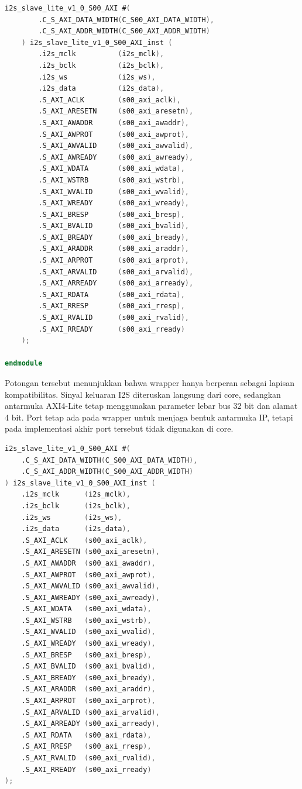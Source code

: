 \begin{lstlisting}[language=Verilog,caption={Wrapper IP \texttt{i2s.v} yang meneruskan antarmuka AXI4-Lite dan keluaran I2S ke core.},label={lst:ch4-wrapper}]
    i2s_slave_lite_v1_0_S00_AXI #(
        .C_S_AXI_DATA_WIDTH(C_S00_AXI_DATA_WIDTH),
        .C_S_AXI_ADDR_WIDTH(C_S00_AXI_ADDR_WIDTH)
    ) i2s_slave_lite_v1_0_S00_AXI_inst (
        .i2s_mclk          (i2s_mclk),
        .i2s_bclk          (i2s_bclk),
        .i2s_ws            (i2s_ws),
        .i2s_data          (i2s_data),
        .S_AXI_ACLK        (s00_axi_aclk),
        .S_AXI_ARESETN     (s00_axi_aresetn),
        .S_AXI_AWADDR      (s00_axi_awaddr),
        .S_AXI_AWPROT      (s00_axi_awprot),
        .S_AXI_AWVALID     (s00_axi_awvalid),
        .S_AXI_AWREADY     (s00_axi_awready),
        .S_AXI_WDATA       (s00_axi_wdata),
        .S_AXI_WSTRB       (s00_axi_wstrb),
        .S_AXI_WVALID      (s00_axi_wvalid),
        .S_AXI_WREADY      (s00_axi_wready),
        .S_AXI_BRESP       (s00_axi_bresp),
        .S_AXI_BVALID      (s00_axi_bvalid),
        .S_AXI_BREADY      (s00_axi_bready),
        .S_AXI_ARADDR      (s00_axi_araddr),
        .S_AXI_ARPROT      (s00_axi_arprot),
        .S_AXI_ARVALID     (s00_axi_arvalid),
        .S_AXI_ARREADY     (s00_axi_arready),
        .S_AXI_RDATA       (s00_axi_rdata),
        .S_AXI_RRESP       (s00_axi_rresp),
        .S_AXI_RVALID      (s00_axi_rvalid),
        .S_AXI_RREADY      (s00_axi_rready)
    );

endmodule
\end{lstlisting}

Potongan tersebut menunjukkan bahwa wrapper hanya berperan sebagai lapisan kompatibilitas. Sinyal keluaran I2S diteruskan langsung dari core, sedangkan antarmuka AXI4-Lite tetap menggunakan parameter lebar bus 32 bit dan alamat 4 bit. Port  tetap ada pada wrapper untuk menjaga bentuk antarmuka IP, tetapi pada implementasi akhir port tersebut tidak digunakan di core.

\begin{lstlisting}[language=Verilog,caption={Instansiasi core I2S di dalam wrapper.},label={lst:ch4-wrapper-inst}]
i2s_slave_lite_v1_0_S00_AXI #(
    .C_S_AXI_DATA_WIDTH(C_S00_AXI_DATA_WIDTH),
    .C_S_AXI_ADDR_WIDTH(C_S00_AXI_ADDR_WIDTH)
) i2s_slave_lite_v1_0_S00_AXI_inst (
    .i2s_mclk      (i2s_mclk),
    .i2s_bclk      (i2s_bclk),
    .i2s_ws        (i2s_ws),
    .i2s_data      (i2s_data),
    .S_AXI_ACLK    (s00_axi_aclk),
    .S_AXI_ARESETN (s00_axi_aresetn),
    .S_AXI_AWADDR  (s00_axi_awaddr),
    .S_AXI_AWPROT  (s00_axi_awprot),
    .S_AXI_AWVALID (s00_axi_awvalid),
    .S_AXI_AWREADY (s00_axi_awready),
    .S_AXI_WDATA   (s00_axi_wdata),
    .S_AXI_WSTRB   (s00_axi_wstrb),
    .S_AXI_WVALID  (s00_axi_wvalid),
    .S_AXI_WREADY  (s00_axi_wready),
    .S_AXI_BRESP   (s00_axi_bresp),
    .S_AXI_BVALID  (s00_axi_bvalid),
    .S_AXI_BREADY  (s00_axi_bready),
    .S_AXI_ARADDR  (s00_axi_araddr),
    .S_AXI_ARPROT  (s00_axi_arprot),
    .S_AXI_ARVALID (s00_axi_arvalid),
    .S_AXI_ARREADY (s00_axi_arready),
    .S_AXI_RDATA   (s00_axi_rdata),
    .S_AXI_RRESP   (s00_axi_rresp),
    .S_AXI_RVALID  (s00_axi_rvalid),
    .S_AXI_RREADY  (s00_axi_rready)
);
\end{lstlisting}

